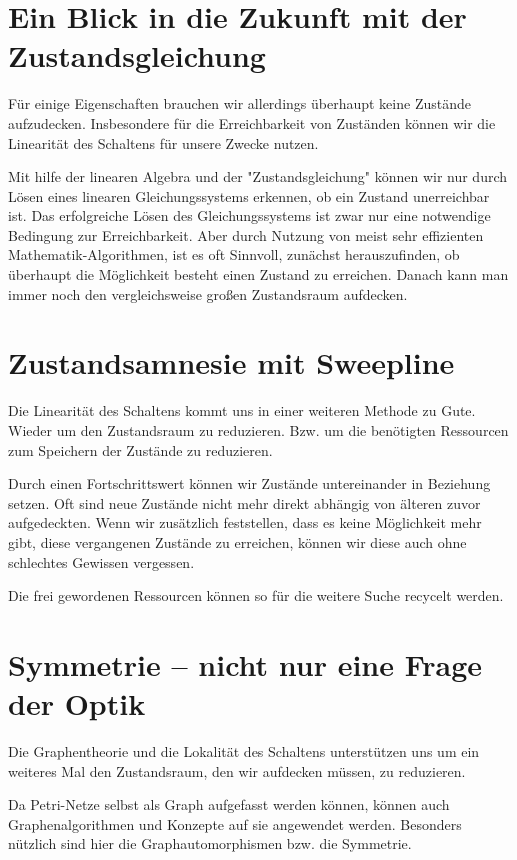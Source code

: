 \section{Ein Blick in die Zukunft mit der Zustandsgleichung}
Für einige Eigenschaften brauchen wir allerdings überhaupt keine Zustände aufzudecken.
Insbesondere für die Erreichbarkeit von Zuständen können wir die Linearität des Schaltens \cite{2.1} für unsere Zwecke nutzen.

Mit hilfe der linearen Algebra und der "Zustandsgleichung" können wir nur durch Lösen eines linearen Gleichungssystems erkennen, ob ein Zustand unerreichbar ist.
Das erfolgreiche Lösen des Gleichungssystems ist zwar nur eine notwendige Bedingung zur Erreichbarkeit.
Aber durch Nutzung von meist sehr effizienten Mathematik-Algorithmen, ist es oft Sinnvoll, zunächst herauszufinden, ob überhaupt die Möglichkeit besteht einen Zustand zu erreichen. Danach kann man immer noch den vergleichsweise großen Zustandsraum aufdecken.

\section{Zustandsamnesie mit Sweepline}
Die Linearität des Schaltens kommt uns in einer weiteren Methode zu Gute.
Wieder um den Zustandsraum zu reduzieren. Bzw. um die benötigten Ressourcen zum Speichern der Zustände zu reduzieren.

Durch einen Fortschrittswert können wir Zustände untereinander in Beziehung setzen.
Oft sind neue Zustände nicht mehr direkt abhängig von älteren zuvor aufgedeckten.
Wenn wir zusätzlich feststellen, dass es keine Möglichkeit mehr gibt, diese vergangenen Zustände zu erreichen, können wir diese auch ohne schlechtes Gewissen vergessen.

Die frei gewordenen Ressourcen können so für die weitere Suche recycelt werden.

\section{Symmetrie -- nicht nur eine Frage der Optik}
Die Graphentheorie und die Lokalität des Schaltens\cite{2.3} unterstützen uns um ein weiteres Mal den Zustandsraum, den wir aufdecken müssen, zu reduzieren.

Da Petri-Netze selbst als Graph aufgefasst werden können, können auch Graphenalgorithmen  und Konzepte auf sie angewendet werden. 
Besonders nützlich sind hier die Graphautomorphismen bzw. die Symmetrie.

